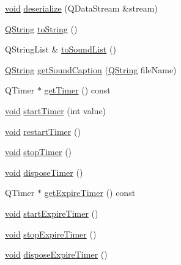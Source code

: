 \begin{DoxyCompactItemize}
\item 
\hyperlink{group___u_a_v_objects_plugin_ga444cf2ff3f0ecbe028adce838d373f5c}{void} \hyperlink{group___notify_plugin_ga02e47b11a2cd7d0e9b608c497afbf359}{deserialize} (\-Q\-Data\-Stream \&stream)
\item 
\hyperlink{group___u_a_v_objects_plugin_gab9d252f49c333c94a72f97ce3105a32d}{\-Q\-String} \hyperlink{group___notify_plugin_gacced9ea8ef4e62bf9f126766c99514c9}{to\-String} ()
\item 
\-Q\-String\-List \& \hyperlink{group___notify_plugin_ga3fa8d750e630be2b90fbbe2ad536a55b}{to\-Sound\-List} ()
\item 
\hyperlink{group___u_a_v_objects_plugin_gab9d252f49c333c94a72f97ce3105a32d}{\-Q\-String} \hyperlink{group___notify_plugin_gadaf0f176a8851c6a9fe551bf80b61cb4}{get\-Sound\-Caption} (\hyperlink{group___u_a_v_objects_plugin_gab9d252f49c333c94a72f97ce3105a32d}{\-Q\-String} file\-Name)
\item 
\-Q\-Timer $\ast$ \hyperlink{group___notify_plugin_gad0b36630b519b091944bbf350ca8de5f}{get\-Timer} () const 
\item 
\hyperlink{group___u_a_v_objects_plugin_ga444cf2ff3f0ecbe028adce838d373f5c}{void} \hyperlink{group___notify_plugin_gaa7aa70f2843fa4dfaf65d257280afc6b}{start\-Timer} (int value)
\item 
\hyperlink{group___u_a_v_objects_plugin_ga444cf2ff3f0ecbe028adce838d373f5c}{void} \hyperlink{group___notify_plugin_gacf26398de566bf5f6b947e9065841653}{restart\-Timer} ()
\item 
\hyperlink{group___u_a_v_objects_plugin_ga444cf2ff3f0ecbe028adce838d373f5c}{void} \hyperlink{group___notify_plugin_ga40c3dd7de6f84d1c49d6536d3bf7c310}{stop\-Timer} ()
\item 
\hyperlink{group___u_a_v_objects_plugin_ga444cf2ff3f0ecbe028adce838d373f5c}{void} \hyperlink{group___notify_plugin_gaa2f1891b46a9b84e08cd3cde71981655}{dispose\-Timer} ()
\item 
\-Q\-Timer $\ast$ \hyperlink{group___notify_plugin_gac3e54f4c867cf1ab32a5127dcc5dcebe}{get\-Expire\-Timer} () const 
\item 
\hyperlink{group___u_a_v_objects_plugin_ga444cf2ff3f0ecbe028adce838d373f5c}{void} \hyperlink{group___notify_plugin_ga1cea7db89fc4ba5cc6177e4676fc6f5b}{start\-Expire\-Timer} ()
\item 
\hyperlink{group___u_a_v_objects_plugin_ga444cf2ff3f0ecbe028adce838d373f5c}{void} \hyperlink{group___notify_plugin_gafff508e9352fb1a5ed40502e6845ebef}{stop\-Expire\-Timer} ()
\item 
\hyperlink{group___u_a_v_objects_plugin_ga444cf2ff3f0ecbe028adce838d373f5c}{void} \hyperlink{group___notify_plugin_ga701d292a397a1198e167f249475b77e0}{dispose\-Expire\-Timer} ()
\end{DoxyCompactItemize}
